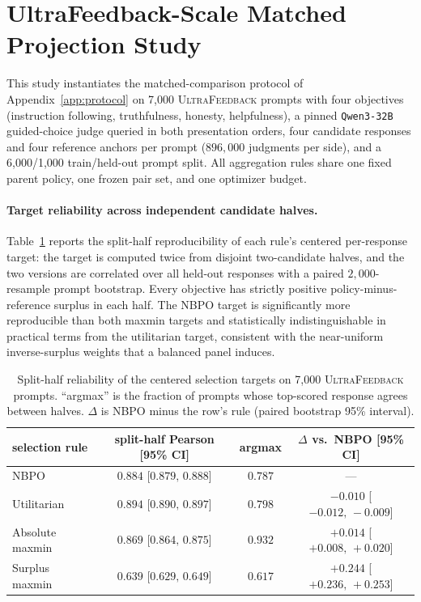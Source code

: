 \documentclass{article}
\theoremstyle{remark}
\theoremstyle{plain}
\newcommand{\NBPO}{\textsc{NBPO}}
\begin{document}
\section{UltraFeedback-Scale Matched Projection Study}
\label{app:uf-study}
This study instantiates the matched-comparison protocol of Appendix~\ref{app:protocol} on 7{,}000 \textsc{UltraFeedback} prompts with four objectives (instruction following, truthfulness, honesty, helpfulness), a pinned \texttt{Qwen3-32B} guided-choice judge queried in both presentation orders, four candidate responses and four reference anchors per prompt ($896{,}000$ judgments per side), and a 6{,}000/1{,}000 train/held-out prompt split. All aggregation rules share one fixed parent policy, one frozen pair set, and one optimizer budget.

\paragraph{Target reliability across independent candidate halves.}
Table~\ref{tab:uf-reliability} reports the split-half reproducibility of each rule's centered per-response target: the target is computed twice from disjoint two-candidate halves, and the two versions are correlated over all held-out responses with a paired $2{,}000$-resample prompt bootstrap. Every objective has strictly positive policy-minus-reference surplus in each half. The \NBPO{} target is significantly more reproducible than both maxmin targets and statistically indistinguishable in practical terms from the utilitarian target, consistent with the near-uniform inverse-surplus weights that a balanced panel induces.

\begin{table}[htbp]
\centering\footnotesize
\setlength{\tabcolsep}{3.5pt}
\caption{Split-half reliability of the centered selection targets on 7{,}000 \textsc{UltraFeedback} prompts. ``argmax'' is the fraction of prompts whose top-scored response agrees between halves. $\Delta$ is \NBPO{} minus the row's rule (paired bootstrap 95\% interval).}
\label{tab:uf-reliability}
\begin{tabular}{lccc}
\toprule
selection rule & split-half Pearson [95\% CI] & argmax & $\Delta$ vs.\ \NBPO{} [95\% CI]\\
\midrule
\NBPO{} & $0.884$ [$0.879,\,0.888$] & $0.787$ & ---\\
Utilitarian & $0.894$ [$0.890,\,0.897$] & $0.798$ & $-0.010$ [$-0.012,\,-0.009$]\\
Absolute maxmin & $0.869$ [$0.864,\,0.875$] & $0.932$ & $+0.014$ [$+0.008,\,+0.020$]\\
Surplus maxmin & $0.639$ [$0.629,\,0.649$] & $0.617$ & $+0.244$ [$+0.236,\,+0.253$]\\
\bottomrule
\end{tabular}
\end{table}
\end{document}
